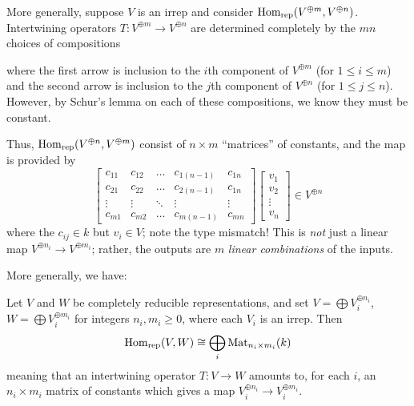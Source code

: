 More generally, suppose $V$ is an irrep and consider
$\operatorname{Hom}_{\mathrm{rep}}(V^{\oplus m}, V^{\oplus n})$.
Intertwining operators
$T \colon V^{\oplus m} \to V^{\oplus n}$
are determined completely
by the $mn$ choices of compositions
\begin{center}
\end{center}
where the first arrow is inclusion to the $i$th component of $V^{\oplus m}$
(for $1 \le i \le m$) and the second arrow is inclusion to the $j$th
component of $V^{\oplus n}$ (for $1 \le j \le n$).
However, by Schur's lemma on each of these compositions,
we know they must be constant.

Thus, $\operatorname{Hom}_{\mathrm{rep}}(V^{\oplus n}, V^{\oplus m})$ consist of $n \times m$ ``matrices''
of constants, and the map is provided by
\[
	\begin{bmatrix}
		c_{11} & c_{12} & \dots & c_{1(n-1)} & c_{1n} \\
		c_{21} & c_{22} & \dots & c_{2(n-1)} & c_{1n} \\
		\vdots & \vdots & \ddots & \vdots & \vdots \\
		c_{m1} & c_{m2} & \dots & c_{m(n-1)} & c_{mn}
	\end{bmatrix}
	\begin{bmatrix} v_1 \\ v_2 \\ \vdots \\ v_n \end{bmatrix}
	\in V^{\oplus n}
\]
where the $c_{ij} \in k$ but $v_i \in V$; note the type mismatch!
This is \emph{not} just a linear map $V^{\oplus n_i} \to V^{\oplus m_i}$;
rather, the outputs are $m$ \emph{linear combinations} of the inputs.

More generally, we have:
\begin{theorem}
	\label{thm:compred_schur}
	Let $V$ and $W$ be completely reducible representations,
	and set $V = \bigoplus V_i^{\oplus n_i}$, $W = \bigoplus V_i^{\oplus m_i}$
	for integers $n_i, m_i \ge 0$, where each $V_i$ is an irrep.
	Then
	\[ \operatorname{Hom}_{\mathrm{rep}}(V, W)
		\cong \bigoplus_i \mathrm{Mat}_{n_i \times m_i}(k) \]
	meaning that an intertwining operator $T \colon V \to W$
	amounts to, for each $i$, an $n_i \times m_i$ matrix of constants
	which gives a map $V_i^{\oplus n_i} \to V_i^{\oplus m_i}$.
\end{theorem}

